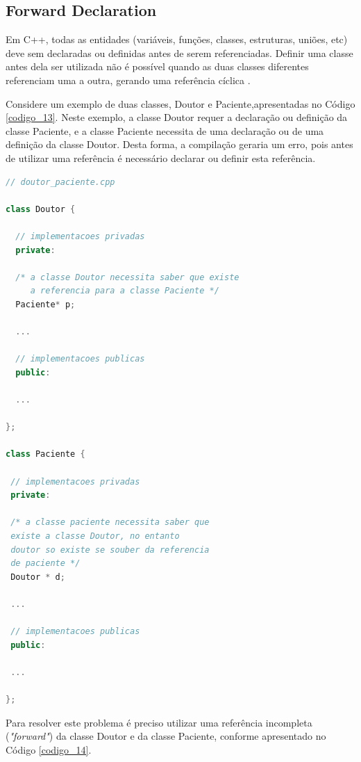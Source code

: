 \subsection{Forward Declaration}\label{forward_declaration_section}

Em C++, todas as entidades (variáveis, funções, classes, estruturas, uniões,
 etc) deve sem declaradas ou definidas antes de serem referenciadas. Definir
 uma classe antes dela ser utilizada não é possível quando as duas classes
 diferentes referenciam uma a outra, gerando uma referência cíclica
\cite{ref43}.

Considere um exemplo de duas classes, Doutor e Paciente,apresentadas no 
Código \ref{codigo_13}. Neste exemplo, a classe Doutor requer a 
declaração ou definição da classe Paciente, e a classe Paciente necessita 
de uma declaração ou de uma definição da classe Doutor. Desta forma, a 
compilação geraria um erro, pois antes de utilizar uma referência é 
necessário declarar ou definir esta referência.

\begin{lstlisting}[language=C++,frame=single,captionpos=b,caption={
                        Implementação de classes Paciente e Doutor},
                                                     label=codigo_13]
// doutor_paciente.cpp

class Doutor {

  // implementacoes privadas
  private:

  /* a classe Doutor necessita saber que existe 
     a referencia para a classe Paciente */
  Paciente* p; 

  ...          

  // implementacoes publicas
  public:

  ...	

};

class Paciente {

 // implementacoes privadas
 private:

 /* a classe paciente necessita saber que 
 existe a classe Doutor, no entanto
 doutor so existe se souber da referencia
 de paciente */
 Doutor * d; 

 ...  

 // implementacoes publicas
 public:

 ...  

};

\end{lstlisting}

Para resolver este problema é preciso utilizar uma 
referência incompleta (\textit{"forward"}) da classe Doutor e da
 classe Paciente, conforme apresentado no Código \ref{codigo_14}. 

